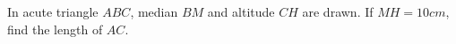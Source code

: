 In acute triangle $ABC$, median $BM$ and altitude $CH$ are drawn. If $MH=10cm$, find the length of $AC$.
